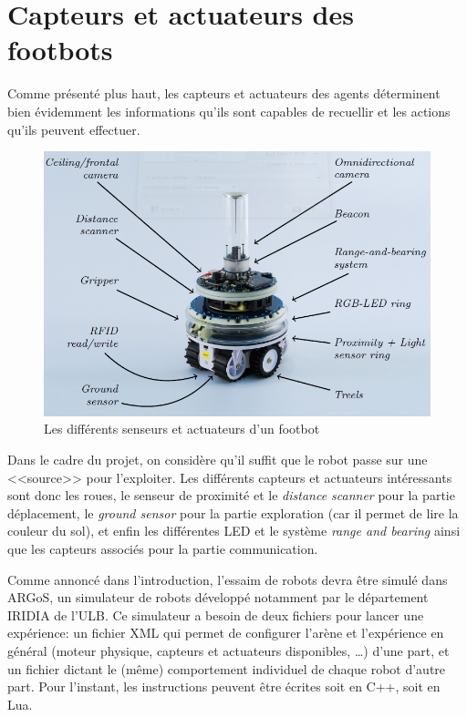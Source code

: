 \section{Capteurs et actuateurs des footbots}

Comme présenté plus haut, les capteurs et actuateurs des agents déterminent bien évidemment les informations qu'ils sont capables de recuellir et les actions qu'ils peuvent effectuer.

\begin{figure}[htb]
   \includegraphics[width=\textwidth]{pics/footbot.png}
      \caption{Les différents senseurs et actuateurs d'un footbot~\cite{argosSite1}}
\end{figure}

Dans le cadre du projet, on considère qu'il suffit que le robot passe sur une <<source>> pour l'exploiter. Les différents capteurs et actuateurs intéressants sont donc les roues, le senseur de proximité et le \emph{distance scanner} pour la partie déplacement, le \emph{ground sensor} pour la partie exploration (car il permet de lire la couleur du sol), et enfin les différentes LED et le système \emph{range and bearing} ainsi que les capteurs associés pour la partie communication.

Comme annoncé dans l'introduction, l'essaim de robots devra être simulé dans ARGoS, un simulateur de robots développé notamment par le département IRIDIA de l'ULB. Ce simulateur a besoin de deux fichiers pour lancer une expérience: un fichier XML qui permet de configurer l'arène et l'expérience en général (moteur physique, capteurs et actuateurs disponibles, \ldots) \cite{argosReport} d'une part, et un fichier dictant le (même) comportement individuel de chaque robot d'autre part. Pour l'instant, les instructions peuvent être écrites soit en C++, soit en Lua.


